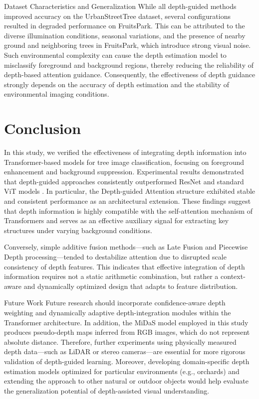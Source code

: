 \documentclass{article}
\begin{document}
Dataset Characteristics and Generalization
While all depth-guided methods improved accuracy on the UrbanStreetTree dataset, several configurations resulted in degraded performance on FruitsPark. This can be attributed to the diverse illumination conditions, seasonal variations, and the presence of nearby ground and neighboring trees in FruitsPark, which introduce strong visual noise. Such environmental complexity can cause the depth estimation model to misclassify foreground and background regions, thereby reducing the reliability of depth-based attention guidance. Consequently, the effectiveness of depth guidance strongly depends on the accuracy of depth estimation and the stability of environmental imaging conditions.

\section{Conclusion}
In this study, we verified the effectiveness of integrating depth information into Transformer-based models for tree image classification, focusing on foreground enhancement and background suppression. Experimental results demonstrated that depth-guided approaches consistently outperformed ResNet \cite{ref12} and standard ViT models \cite{ref1}. In particular, the Depth-guided Attention structure exhibited stable and consistent performance as an architectural extension. These findings suggest that depth information is highly compatible with the self-attention mechanism of Transformers and serves as an effective auxiliary signal for extracting key structures under varying background conditions.

Conversely, simple additive fusion methods—such as Late Fusion and Piecewise Depth processing—tended to destabilize attention due to disrupted scale consistency of depth features. This indicates that effective integration of depth information requires not a static arithmetic combination, but rather a context-aware and dynamically optimized design that adapts to feature distribution.

Future Work
Future research should incorporate confidence-aware depth weighting and dynamically adaptive depth-integration modules within the Transformer architecture. In addition, the MiDaS \cite{ref3} model employed in this study produces pseudo-depth maps inferred from RGB images, which do not represent absolute distance. Therefore, further experiments using physically measured depth data—such as LiDAR or stereo cameras—are essential for more rigorous validation of depth-guided learning. Moreover, developing domain-specific depth estimation models optimized for particular environments (e.g., orchards) and extending the approach to other natural or outdoor objects would help evaluate the generalization potential of depth-assisted visual understanding.
 
\end{document}
